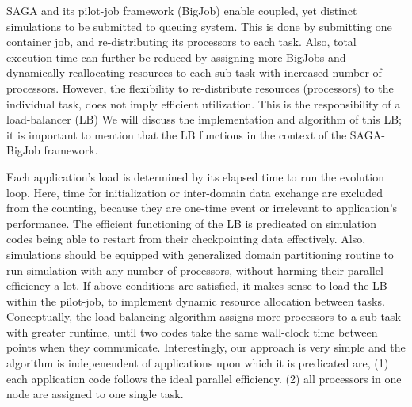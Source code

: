 \documentclass[conference,final]{IEEEtran}
\begin{document}
SAGA and its pilot-job framework (BigJob) enable coupled, yet distinct
simulations to be
submitted to queuing system. This is done by submitting one container
job, and re-distributing its processors to each task. Also, total
execution time can further be reduced by assigning more BigJobs and
dynamically reallocating resources to each sub-task with increased
number of processors. However, the flexibility to re-distribute
resources (processors) to the individual task, does not imply
efficient utilization. This is the responsibility of a load-balancer
(LB) We will discuss the implementation and algorithm of this LB; it
is important to mention that the LB functions in the context of the
SAGA-BigJob framework.


Each application's load is determined by its elapsed time to run the
evolution loop. Here, time for initialization or inter-domain data
exchange are excluded from the counting, because they are one-time
event or irrelevant to application's performance.  The efficient
functioning of the LB is predicated on simulation codes being able to
restart from their checkpointing data effectively.  Also, simulations
should be equipped with generalized domain partitioning routine to run
simulation with any number of processors, without harming their
parallel efficiency a lot. If above conditions are satisfied, it makes
sense to load the LB within the pilot-job, to implement dynamic
resource allocation between tasks.  Conceptually, the load-balancing
algorithm assigns more processors to a sub-task with greater runtime,
until two codes take the same wall-clock time between points when they
communicate. Interestingly, our approach is very simple and the
algorithm is indepenendent of applications upon which it is predicated
are, (1) each application code follows the ideal parallel efficiency.
(2) all processors in one node are assigned to one single task.
\end{document}
